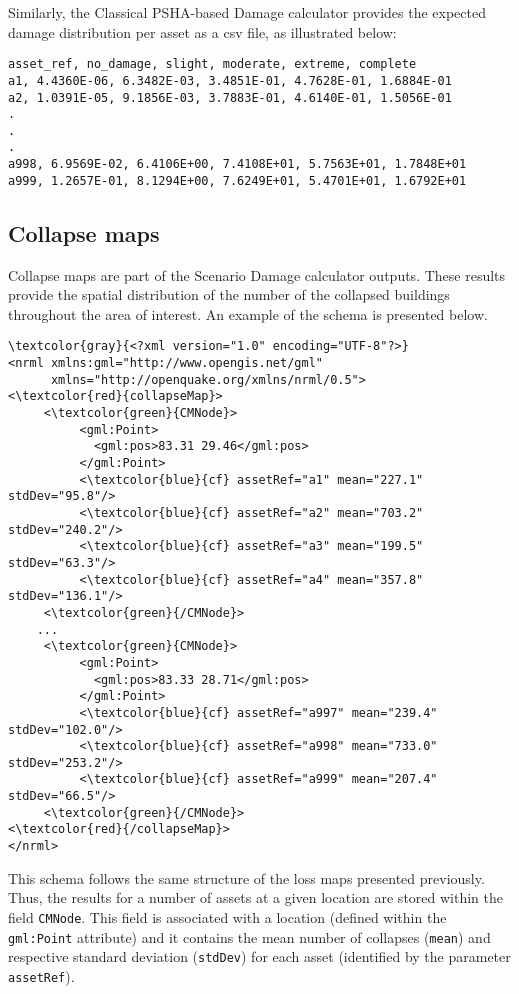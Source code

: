 Similarly, the Classical PSHA-based Damage calculator provides the expected
damage distribution per asset as a csv file, as illustrated below:

\begin{Verbatim}[frame=single, commandchars=\\\{\}, samepage=false]
asset_ref, no_damage, slight, moderate, extreme, complete
a1, 4.4360E-06, 6.3482E-03, 3.4851E-01, 4.7628E-01, 1.6884E-01
a2, 1.0391E-05, 9.1856E-03, 3.7883E-01, 4.6140E-01, 1.5056E-01
.
.
.
a998, 6.9569E-02, 6.4106E+00, 7.4108E+01, 5.7563E+01, 1.7848E+01
a999, 1.2657E-01, 8.1294E+00, 7.6249E+01, 5.4701E+01, 1.6792E+01
\end{Verbatim}

\subsection{Collapse maps}

Collapse maps are part of the Scenario Damage calculator outputs. These
results provide the spatial distribution of the number of the collapsed
buildings throughout the area of interest. An example of the schema is
presented below.

\begin{Verbatim}[frame=single, commandchars=\\\{\}, samepage=false]
\textcolor{gray}{<?xml version="1.0" encoding="UTF-8"?>}
<nrml xmlns:gml="http://www.opengis.net/gml"
      xmlns="http://openquake.org/xmlns/nrml/0.5">
<\textcolor{red}{collapseMap}>
     <\textcolor{green}{CMNode}>
          <gml:Point>
            <gml:pos>83.31 29.46</gml:pos>
          </gml:Point>
          <\textcolor{blue}{cf} assetRef="a1" mean="227.1" stdDev="95.8"/>
          <\textcolor{blue}{cf} assetRef="a2" mean="703.2" stdDev="240.2"/>
          <\textcolor{blue}{cf} assetRef="a3" mean="199.5" stdDev="63.3"/>
          <\textcolor{blue}{cf} assetRef="a4" mean="357.8" stdDev="136.1"/>
     <\textcolor{green}{/CMNode}>
    ...
     <\textcolor{green}{CMNode}>
          <gml:Point>
            <gml:pos>83.33 28.71</gml:pos>
          </gml:Point>
          <\textcolor{blue}{cf} assetRef="a997" mean="239.4" stdDev="102.0"/>
          <\textcolor{blue}{cf} assetRef="a998" mean="733.0" stdDev="253.2"/>
          <\textcolor{blue}{cf} assetRef="a999" mean="207.4" stdDev="66.5"/>
     <\textcolor{green}{/CMNode}>
<\textcolor{red}{/collapseMap}>
</nrml>
\end{Verbatim}

This schema follows the same structure of the loss maps presented previously.
Thus, the results for a number of \glspl{asset} at a given location are stored
within the field \Verb+CMNode+. This field is associated with a location
(defined within the \Verb+gml:Point+ attribute) and it contains the mean
number of collapses (\Verb+mean+) and respective standard deviation
(\Verb+stdDev+) for each \gls{asset} (identified by the parameter
\Verb+assetRef+).

